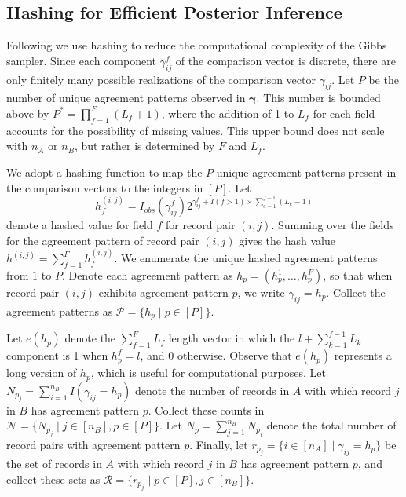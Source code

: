 \documentclass[12pt,letterpaper]{article}
\newcommand{\1}[1]{\mathbb{I}\!\left[#1\right]} %
\begin{document}
\subsection{Hashing for Efficient Posterior Inference}\label{app:hashing}
Following \cite{kundinger_2023} we use hashing to reduce the computational complexity of the Gibbs sampler. Since each component $\gamma_{ij}^f$ of the comparison vector is discrete, there are only finitely many possible realizations of the comparison vector $\gamma_{ij}$. Let $P$ be the number of unique agreement patterns observed in $\bm{\gamma}$. This number is bounded above by $P^{*} =  \prod_{f=1}^F (L_f + 1)$, where the addition of 1 to $L_f$ for each field accounts for the possibility of missing values. This upper bound does not scale with $n_A$ or $n_B$, but rather is determined by $F$ and $L_f$.  

We adopt a hashing function to map the $P$ unique agreement patterns present in the comparison vectors to the integers in $[P]$. Let
\begin{equation}
	\label{eq:hashfunc}
	h_f^{(i,j)} = I_{obs}( \gamma_{ij}^f) 2^{\gamma_{ij}^f + I(f>1) \times \sum_{e=1}^{f-1}(L_{e} - 1)}
\end{equation}
denote a hashed value for field $f$ for record pair $(i,j)$. Summing over the fields for the agreement pattern of record pair $(i,j)$ gives the hash value $h^{(i,j)}=\sum_{f=1}^Fh_f^{(i,j)}$. We enumerate the unique hashed agreement patterns from $1$ to $P$. Denote each agreement pattern as $h_p=(h_p^1,\dots,h_p^F)$, so that when record pair $(i,j)$ exhibits agreement pattern $p$, we write $\gamma_{ij}=h_p$.  Collect the agreement patterns as $\mathcal{P}=\{h_p\mid p\in[P]\}$.

Let $e(h_p)$ denote the $\sum_{f=1}^FL_f$ length vector in which the $l + \sum_{k=1}^{f-1} L_k$ component is 1 when $h_p^f = l$, and 0 otherwise. Observe that $e(h_p)$ represents a long version of $h_p$, which is useful for computational purposes. Let $N_{p_j}=\sum_{i=1}^{n_B}I(\gamma_{ij}=h_p)$ denote the number of records in $A$ with which record $j$ in $B$ has agreement pattern $p$. Collect these counts in $\mathcal{N}=\{N_{p_j}\mid j\in[n_B], p\in[P]\}.$ Let $N_p=\sum_{j=1}^{n_B}N_{p_j}$ denote the total number of record pairs with agreement pattern $p$. Finally, let $r_{p_j}=\{i\in[n_A]\mid \gamma_{ij}=h_p\}$ be the set of records in $A$ with which record $j$ in $B$ has agreement pattern $p$, and collect these sets as $\mathcal{R}=\{r_{p_j}\mid p\in[P], j\in[n_B]\}$. 
\end{document}
